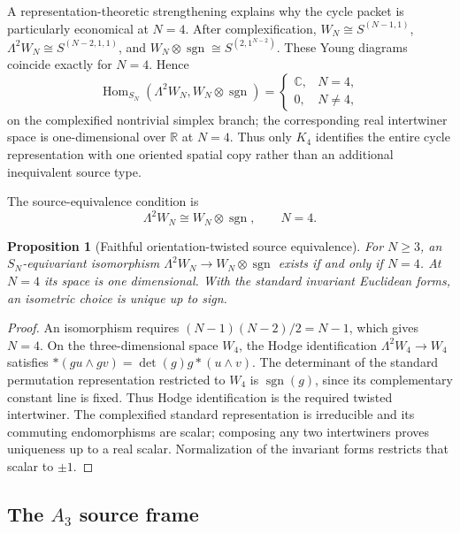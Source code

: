 \documentclass[11pt]{article}
\numberwithin{equation}{section}
\newtheorem{proposition}[proposition]{Proposition}
\theoremstyle{definition}
\theoremstyle{remark}
\newcommand{\R}{\mathbb R}
\newcommand{\C}{\mathbb C}
\newcommand{\Hom}{\operatorname{Hom}}
\begin{document}
A representation-theoretic strengthening explains why the cycle packet is
particularly economical at $N=4$.  After complexification,
$W_N\cong S^{(N-1,1)}$,
$\Lambda^2W_N\cong S^{(N-2,1,1)}$, and
$W_N\otimes\operatorname{sgn}\cong S^{(2,1^{N-2})}$.  These Young diagrams
coincide exactly for $N=4$.  Hence
\begin{equation}
 \Hom_{S_N}(\Lambda^2W_N,W_N\otimes\operatorname{sgn})
 =\begin{cases}\C,&N=4,\\0,&N\ne4,\end{cases}
 \label{eq:supp-oriented-copy}
\end{equation}
on the complexified nontrivial simplex branch; the corresponding real
intertwiner space is one-dimensional over $\R$ at $N=4$. Thus only $K_4$ identifies the entire cycle
representation with one oriented spatial copy rather than an additional
inequivalent source type.


The source-equivalence condition is
\begin{equation}
 \Lambda^2W_N\cong W_N\otimes\operatorname{sgn},\qquad N=4.
 \label{eq:main-source-equivalence}
\end{equation}

\begin{proposition}[Faithful orientation-twisted source equivalence]
\label{prop:supp-source-equivalence}
For $N\ge3$, an $S_N$-equivariant isomorphism
$\Lambda^2W_N\to W_N\otimes\operatorname{sgn}$ exists if and only if
$N=4$. At $N=4$ its space is one dimensional. With the standard invariant
Euclidean forms, an isometric choice is unique up to sign.
\end{proposition}
\begin{proof}
An isomorphism requires
$(N-1)(N-2)/2=N-1$, which gives $N=4$. On the three-dimensional space
$W_4$, the Hodge identification $\Lambda^2W_4\to W_4$ satisfies
$*(gu\wedge gv)=\det(g)g*(u\wedge v)$. The determinant of the standard
permutation representation restricted to $W_4$ is $\operatorname{sgn}(g)$,
since its complementary constant line is fixed. Thus Hodge identification
is the required twisted intertwiner. The complexified standard
representation is irreducible and its commuting endomorphisms are scalar;
composing any two intertwiners proves uniqueness up to a real scalar.
Normalization of the invariant forms restricts that scalar to $\pm1$.
\end{proof}


\subsection{The \texorpdfstring{$A_3$}{A3} source frame}
\end{document}
